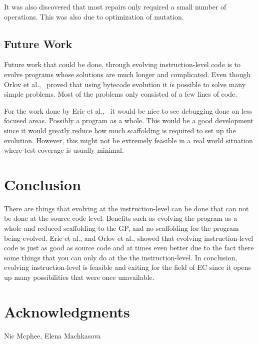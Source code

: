 \documentclass{sig-alternate}
\begin{document}
It was also discovered that most repairs only required a small number of operations. This was also due to optimization of mutation. 

\subsection{Future Work}
Future work that could be done, through evolving instruction-level code is to evolve programs whose solutions are much longer and complicated. Even though Orlov et al.,~\cite{FINCH:2011} proved that using bytecode evolution it is possible to solve many simple problems. Most of the problems only consisted of a few lines of code.

For the work done by Eric et al.,~\cite{Assembly:2010} it would be nice to see debugging done on less focused areas. Possibly a program as a whole. This would be a good development since it would greatly reduce how much scaffolding is required to set up the evolution. However, this might not be extremely feasible in a real world situation where test coverage is usually minimal.


\section{Conclusion}
There are things that evolving at the instruction-level can be done that can not be done at the source code level. Benefits such as evolving the program as a whole and reduced scaffolding to the GP, and no scaffolding for the program being evolved. Eric et al., and Orlov et al., showed that evolving instruction-level code is just as good as source code and at times even better due to the fact there some things that you can only do at the the instruction-level. In conclusion, evolving instruction-level is feasible and exiting for the field of EC since it opens up many possibilities that were once unavailable.

\section{Acknowledgments}
Nic Mcphee, Elena Machkasova

%

%
%
\end{document}
